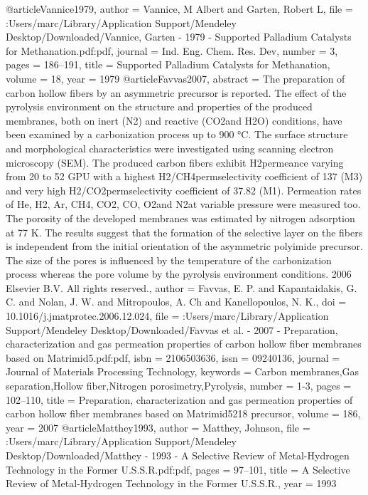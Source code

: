 @article{Vannice1979,
author = {Vannice, M Albert and Garten, Robert L},
file = {:Users/marc/Library/Application Support/Mendeley Desktop/Downloaded/Vannice, Garten - 1979 - Supported Palladium Catalysts for Methanation.pdf:pdf},
journal = {Ind. Eng. Chem. Res. Dev},
number = {3},
pages = {186--191},
title = {{Supported Palladium Catalysts for Methanation}},
volume = {18},
year = {1979}
}
@article{Favvas2007,
abstract = {The preparation of carbon hollow fibers by an asymmetric precursor is reported. The effect of the pyrolysis environment on the structure and properties of the produced membranes, both on inert (N2) and reactive (CO2and H2O) conditions, have been examined by a carbonization process up to 900 °C. The surface structure and morphological characteristics were investigated using scanning electron microscopy (SEM). The produced carbon fibers exhibit H2permeance varying from 20 to 52 GPU with a highest H2/CH4permselectivity coefficient of 137 (M3) and very high H2/CO2permselectivity coefficient of 37.82 (M1). Permeation rates of He, H2, Ar, CH4, CO2, CO, O2and N2at variable pressure were measured too. The porosity of the developed membranes was estimated by nitrogen adsorption at 77 K. The results suggest that the formation of the selective layer on the fibers is independent from the initial orientation of the asymmetric polyimide precursor. The size of the pores is influenced by the temperature of the carbonization process whereas the pore volume by the pyrolysis environment conditions. {\textcopyright} 2006 Elsevier B.V. All rights reserved.},
author = {Favvas, E. P. and Kapantaidakis, G. C. and Nolan, J. W. and Mitropoulos, A. Ch and Kanellopoulos, N. K.},
doi = {10.1016/j.jmatprotec.2006.12.024},
file = {:Users/marc/Library/Application Support/Mendeley Desktop/Downloaded/Favvas et al. - 2007 - Preparation, characterization and gas permeation properties of carbon hollow fiber membranes based on Matrimid{\textregistered}5.pdf:pdf},
isbn = {2106503636},
issn = {09240136},
journal = {Journal of Materials Processing Technology},
keywords = {Carbon membranes,Gas separation,Hollow fiber,Nitrogen porosimetry,Pyrolysis},
number = {1-3},
pages = {102--110},
title = {{Preparation, characterization and gas permeation properties of carbon hollow fiber membranes based on Matrimid{\textregistered}5218 precursor}},
volume = {186},
year = {2007}
}
@article{Matthey1993,
author = {Matthey, Johnson},
file = {:Users/marc/Library/Application Support/Mendeley Desktop/Downloaded/Matthey - 1993 - A Selective Review of Metal-Hydrogen Technology in the Former U.S.S.R.pdf:pdf},
pages = {97--101},
title = {{A Selective Review of Metal-Hydrogen Technology in the Former U.S.S.R.}},
year = {1993}
}
